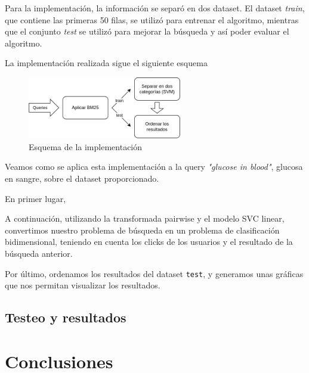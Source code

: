 \documentclass[a4paper,12pt]{article}
\begin{document}
	Para la implementación, la información se separó en dos dataset. El dataset \textit{train}, que contiene las primeras 50 filas, se utilizó para entrenar el algoritmo, mientras que el conjunto \textit{test} se utilizó para mejorar la búsqueda y así poder evaluar el algoritmo.
	
	La implementación realizada sigue el siguiente esquema
	
	\begin{figure}[H]
		\centering
		\includegraphics[width=0.6\textwidth]{include/esquema_implementacion.png}
		\caption{Esquema de la implementación}
	\end{figure}
	
	Veamos como se aplica esta implementación a la query \textit{"glucose in blood"}, glucosa en sangre, sobre el dataset proporcionado. 
	
	En primer lugar, 

	

	A continuación, utilizando la transformada pairwise y el modelo SVC linear, convertimos nuestro problema de búsqueda en un problema de clasificación bidimensional, teniendo en cuenta los clicks de los usuarios y el resultado de la búsqueda anterior. 
	
	Por último, ordenamos los resultados del dataset \texttt{test}, y generamos unas gráficas que nos permitan visualizar los resultados.
	
	\subsection{Testeo y resultados}
	
	
	
	\section{Conclusiones}
	

	
	
	
	
\end{document}
